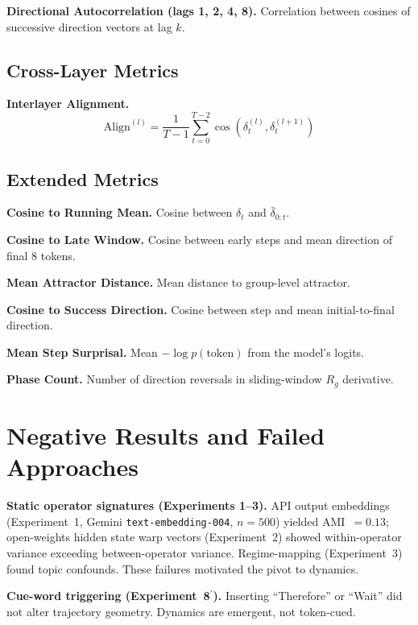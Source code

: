 \documentclass[11pt,twocolumn]{article}
\newcommand{\Rg}{R_g}
\begin{document}
\textbf{Directional Autocorrelation (lags 1, 2, 4, 8).} Correlation between cosines of successive direction vectors at lag $k$.

\subsection{Cross-Layer Metrics}

\textbf{Interlayer Alignment.}
\begin{equation}
\text{Align}^{(l)} = \frac{1}{T-1}\sum_{t=0}^{T-2} \cos\left(\delta_t^{(l)}, \delta_t^{(l+1)}\right)
\end{equation}

\subsection{Extended Metrics}

\textbf{Cosine to Running Mean.} Cosine between $\delta_t$ and $\bar{\delta}_{0:t}$.

\textbf{Cosine to Late Window.} Cosine between early steps and mean direction of final 8 tokens.

\textbf{Mean Attractor Distance.} Mean distance to group-level attractor.

\textbf{Cosine to Success Direction.} Cosine between step and mean initial-to-final direction.

\textbf{Mean Step Surprisal.} Mean $-\log p(\text{token})$ from the model's logits.

\textbf{Phase Count.} Number of direction reversals in sliding-window $\Rg$ derivative.


\section{Negative Results and Failed Approaches}
\label{app:negative}

\textbf{Static operator signatures (Experiments 1--3).} API output embeddings (Experiment~1, Gemini \texttt{text-embedding-004}, $n = 500$) yielded AMI~$= 0.13$; open-weights hidden state warp vectors (Experiment~2) showed within-operator variance exceeding between-operator variance. Regime-mapping (Experiment~3) found topic confounds. These failures motivated the pivot to dynamics.

\textbf{Cue-word triggering (Experiment~8$^\prime$).} Inserting ``Therefore'' or ``Wait'' did not alter trajectory geometry. Dynamics are emergent, not token-cued.
\end{document}
